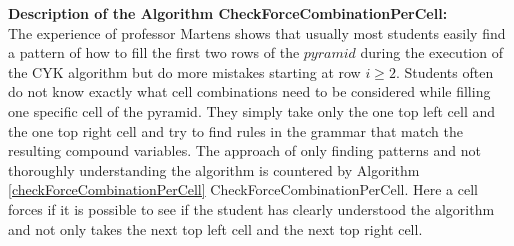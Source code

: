 \noindent \textbf{Description of the Algorithm CheckForceCombinationPerCell: }\\
The experience of professor Martens shows that usually most students easily find a pattern of how to fill the first two rows of the $pyramid$ during the execution of the CYK algorithm but do more mistakes starting at row $i\geq2$. Students often do not know exactly what cell combinations need to be considered while filling one specific cell of the pyramid. They simply take only the one top left cell and the one top right cell and try to find rules in the grammar that match the resulting compound variables. The approach of only finding patterns and not thoroughly understanding the algorithm is countered by Algorithm \ref{checkForceCombinationPerCell} CheckForceCombinationPerCell. Here a cell forces if it is possible to see if the student has clearly understood the algorithm and not only takes the next top left cell and the next top right cell.\\

\noindent 
{}

